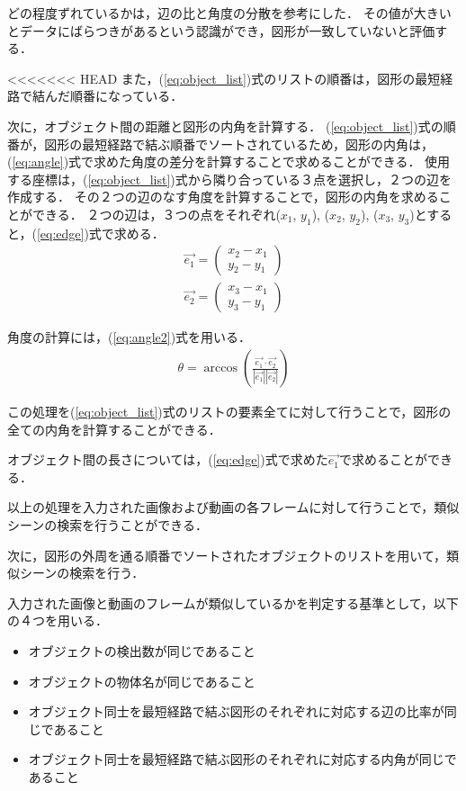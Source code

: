 \documentclass[a4j,12pt,dvipdfmx]{jreport}
\begin{document}
どの程度ずれているかは，辺の比と角度の分散を参考にした．
その値が大きいとデータにばらつきがあるという認識ができ，図形が一致していないと評価する．

<<<<<<< HEAD
また，(\ref{eq:object_list})式のリストの順番は，図形の最短経路で結んだ順番になっている．

次に，オブジェクト間の距離と図形の内角を計算する．
(\ref{eq:object_list})式の順番が，図形の最短経路で結ぶ順番でソートされているため，図形の内角は，(\ref{eq:angle})式で求めた角度の差分を計算することで求めることができる．
使用する座標は，(\ref{eq:object_list})式から隣り合っている３点を選択し，２つの辺を作成する．
その２つの辺のなす角度を計算することで，図形の内角を求めることができる．
２つの辺は，３つの点をそれぞれ($x_1$, $y_1$), ($x_2$, $y_2$), ($x_3$, $y_3$)とすると，(\ref{eq:edge})式で求める．
\begin{eqnarray}
  \label{eq:edge}
  \vec{e_1} = \left( \begin{array}{c} x_2-x_1 \\ y_2-y_1 \end{array} \right) \\
  \vec{e_2} = \left( \begin{array}{c} x_3-x_1 \\ y_3-y_1 \end{array} \right)
\end{eqnarray}

角度の計算には，(\ref{eq:angle2})式を用いる．
\begin{eqnarray}
  \label{eq:angle2}
  \theta = \arccos \left( \frac{\vec{e_1} \cdot \vec{e_2}}{|\vec{e_1}| |\vec{e_2}|} \right)
\end{eqnarray}

この処理を(\ref{eq:object_list})式のリストの要素全てに対して行うことで，図形の全ての内角を計算することができる．

オブジェクト間の長さについては，(\ref{eq:edge})式で求めた$\vec{e_1}$で求めることができる．


以上の処理を入力された画像および動画の各フレームに対して行うことで，類似シーンの検索を行うことができる．


次に，図形の外周を通る順番でソートされたオブジェクトのリストを用いて，類似シーンの検索を行う．

入力された画像と動画のフレームが類似しているかを判定する基準として，以下の４つを用いる．
\begin{itemize}
  \item オブジェクトの検出数が同じであること
  \item オブジェクトの物体名が同じであること
  \item オブジェクト同士を最短経路で結ぶ図形のそれぞれに対応する辺の比率が同じであること
  \item オブジェクト同士を最短経路で結ぶ図形のそれぞれに対応する内角が同じであること
\end{itemize}
\end{document}
